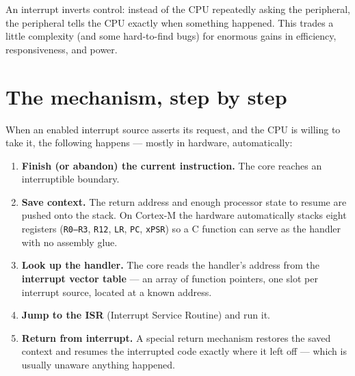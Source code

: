 \documentclass[11pt,a4paper,oneside]{book}
\newcommand{\code}[1]{\texttt{#1}}
\begin{document}
\begin{keyidea}
An interrupt inverts control: instead of the CPU repeatedly asking the
peripheral, the peripheral tells the CPU exactly when something happened. This
trades a little complexity (and some hard-to-find bugs) for enormous gains in
efficiency, responsiveness, and power.
\end{keyidea}

\section{The mechanism, step by step}

When an enabled interrupt source asserts its request, and the CPU is willing to
take it, the following happens --- mostly in hardware, automatically:

\begin{enumerate}[leftmargin=1.5cm]
  \item \textbf{Finish (or abandon) the current instruction.} The core reaches
        an interruptible boundary.
  \item \textbf{Save context.} The return address and enough processor state to
        resume are pushed onto the stack. On Cortex-M the hardware
        automatically stacks eight registers (\code{R0--R3}, \code{R12},
        \code{LR}, \code{PC}, \code{xPSR}) so a C function can serve as the
        handler with no assembly glue.
  \item \textbf{Look up the handler.} The core reads the handler's address from
        the \textbf{interrupt vector table} --- an array of function pointers,
        one slot per interrupt source, located at a known address.
  \item \textbf{Jump to the ISR} (Interrupt Service Routine) and run it.
  \item \textbf{Return from interrupt.} A special return mechanism restores the
        saved context and resumes the interrupted code exactly where it left
        off --- which is usually unaware anything happened.
\end{enumerate}
\end{document}

